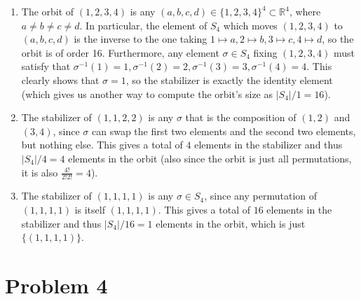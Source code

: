 \documentclass[12pt,letterpaper]{article}
\theoremstyle{definition}
\newcommand{\R}{\mathbb{R}}
\begin{document}
\begin{enumerate}
  \item The orbit of $(1,2,3,4)$ is any $(a,b,c,d) \in \{1,2,3,4\}^{4} \subset \R^{4}$, where $a \neq b \neq c \neq d$. In particular, the element of $S_{4}$ which moves $(1,2,3,4)$ to $(a,b,c,d)$ is the inverse to the one taking $1 \mapsto a, 2 \mapsto b, 3 \mapsto c, 4 \mapsto d$, so the orbit is of order 16. Furthermore, any element $\sigma \in S_{4}$ fixing $(1,2,3,4)$ must satisfy that $\sigma^{-1}(1) = 1, \sigma^{-1}(2) = 2,\sigma^{-1}(3) = 3,\sigma^{-1}(4) = 4$. This clearly shows that $\sigma = 1$, so the stabilizer is exactly the identity element (which gives us another way to compute the orbit's size as $|S_{4}|/1 = 16$).
  \item The stabilizer of $(1,1,2,2)$ is any $\sigma$ that is the composition of $(1,2)$ and $(3,4)$, since $\sigma$ can swap the first two elements and the second two elements, but nothing else. This gives a total of $4$ elements in the stabilizer and thus $|S_{4}|/4 = 4$ elements in the orbit (also since the orbit is just all permutations, it is also $\frac{4!}{2!2!} = 4$).
  \item The stabilizer of $(1,1,1,1)$ is any $\sigma \in S_{4}$, since any permutation of $(1,1,1,1)$ is itself $(1,1,1,1)$. This gives a total of $16$ elements in the stabilizer and thus $|S_{4}|/16 = 1$ elements in the orbit, which is just $\{(1,1,1,1)\}$.
\end{enumerate}

\section*{Problem 4}
\end{document}
